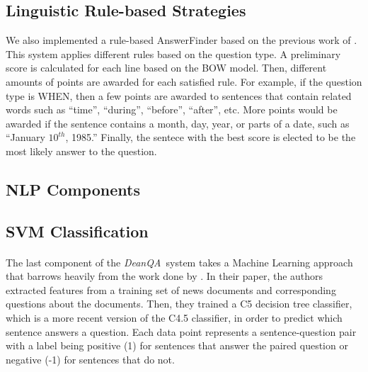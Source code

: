\documentclass[11pt,letterpaper]{article}
\newcommand{\name}{\emph{DeanQA~}}
\begin{document}
\subsection{Linguistic Rule-based Strategies}

We also implemented a rule-based AnswerFinder based on the previous
work of \cite{riloff2000}. This system applies different rules based
on the question type. A preliminary score is calculated for each line
based on the BOW model. Then, different amounts of points are awarded
for each satisfied rule. For example, if the question type is WHEN,
then a few points are awarded to sentences that contain related words
such as ``time'', ``during'', ``before'', ``after'', etc. More points
would be awarded if the sentence contains a month, day, year, or parts
of a date, such as ``January $10^{th}$, 1985.'' Finally, the sentece
with the best score is elected to be the most likely answer to the
question.

\subsection{NLP Components}


\subsection{SVM Classification}
\paragraph{}
The last component of the \name system takes a Machine Learning
approach that barrows heavily from the work done by
\cite{Ng00amachine}.  In their paper, the authors extracted features
from a training set of news documents and corresponding questions
about the documents.  Then, they trained a C5 decision tree
classifier, which is a more recent version of the C4.5
\cite{Quinlan:1993:CPM:152181} classifier, in order to predict which
sentence answers a question.  Each data point represents a
sentence-question pair with a label being positive (1) for sentences
that answer the paired question or negative (-1) for sentences that do
not.
\end{document}
